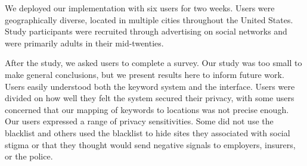 We deployed our implementation with six users for two weeks. 
Users were geographically diverse, located in multiple cities throughout the United States.
Study participants were recruited through advertising on social networks and were primarily adults in their mid-twenties.

After the study, we asked users to complete a survey. 
Our study was too small to make general conclusions, but we present results here to inform future work. 
Users easily understood both the keyword system and the interface. 
Users were divided on how well they felt the system secured their privacy, with some users concerned that our mapping of keywords to locations was not precise enough. 
Our users expressed a range of privacy sensitivities. 
Some did not use the blacklist and others used the blacklist to hide sites they associated with social stigma or that they thought would send negative signals to employers, insurers, or the police.



% 
% 
% 
% 
